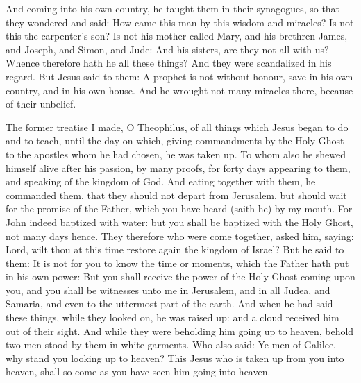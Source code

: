 \begin{multicols}{2}
And coming into his own country, he taught them in their
synagogues, so that they wondered and said: How came this man by this
wisdom and miracles?
Is not this the carpenter's son? Is not his mother called Mary,
and his brethren James, and Joseph, and Simon, and Jude:
And his sisters, are they not all with us? Whence therefore hath
he all these things?
And they were scandalized in his regard. But Jesus said to them:
A prophet is not without honour, save in his own country, and in his own
house.
And he wrought not many miracles there, because of their
unbelief.




\bigskip



The former treatise I made, O Theophilus, of all things which Jesus began to do
and to teach, until the day on which, giving commandments by the Holy Ghost to
the apostles whom he had chosen, he was taken up.  To whom also he shewed
himself alive after his passion, by many proofs, for forty days appearing to
them, and speaking of the kingdom of God.  And eating together with them, he
commanded them, that they should not depart from Jerusalem, but should wait for
the promise of the Father, which you have heard (saith he) by my mouth.  For
John indeed baptized with water: but you shall be baptized with the Holy Ghost,
not many days hence.  They therefore who were come together, asked him, saying:
Lord, wilt thou at this time restore again the kingdom of Israel?  But he said
to them: It is not for you to know the time or moments, which the Father hath
put in his own power: But you shall receive the power of the Holy Ghost coming
upon you, and you shall be witnesses unto me in Jerusalem, and in all Judea,
and Samaria, and even to the uttermost part of the earth.  And when he had said
these things, while they looked on, he was raised up: and a cloud received him
out of their sight.  And while they were beholding him going up to heaven,
behold two men stood by them in white garments.  Who also said: Ye men of
Galilee, why stand you looking up to heaven? This Jesus who is taken up from
you into heaven, shall so come as you have seen him going into heaven.



\end{multicols}
